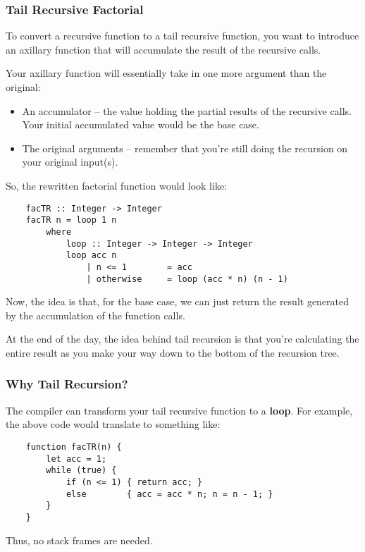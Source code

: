 \documentclass[letterpaper]{article}
\begin{document}
\subsubsection{Tail Recursive Factorial}
To convert a recursive function to a tail recursive function, you want to introduce an axillary function that will accumulate the result of the recursive calls. 

\bigskip 

Your axillary function will essentially take in one more argument than the original: 
\begin{itemize}
    \item An accumulator -- the value holding the partial results of the recursive calls. Your initial accumulated value would be the base case.
    \item The original arguments -- remember that you're still doing the recursion on your original input(s).
\end{itemize}

So, the rewritten factorial function would look like: 
\begin{verbatim}
    facTR :: Integer -> Integer 
    facTR n = loop 1 n  
        where 
            loop :: Integer -> Integer -> Integer
            loop acc n 
                | n <= 1        = acc 
                | otherwise     = loop (acc * n) (n - 1)
\end{verbatim}
Now, the idea is that, for the base case, we can just return the result generated by the accumulation of the function calls. 

\bigskip 

At the end of the day, the idea behind tail recursion is that you're calculating the entire result as you make your way down to the bottom of the recursion tree.


\subsubsection{Why Tail Recursion?}
The compiler can transform your tail recursive function to a \textbf{loop}. For example, the above code would translate to something like: 
\begin{verbatim}
    function facTR(n) {
        let acc = 1;
        while (true) {
            if (n <= 1) { return acc; }
            else        { acc = acc * n; n = n - 1; }
        }
    }
\end{verbatim}
Thus, no stack frames are needed.
\end{document}
